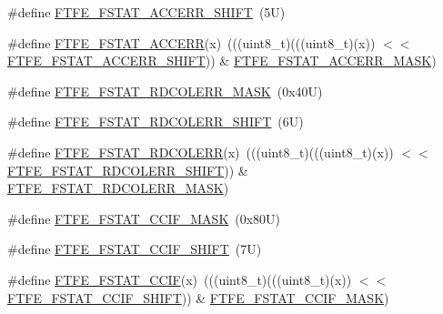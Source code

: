 \begin{DoxyCompactItemize}
\#define \mbox{\hyperlink{group___f_t_f_e___register___masks_ga6bb97df7d14c6a986778b1d8acb765b8}{F\+T\+F\+E\+\_\+\+F\+S\+T\+A\+T\+\_\+\+A\+C\+C\+E\+R\+R\+\_\+\+S\+H\+I\+FT}}~(5\+U)
\item 
\#define \mbox{\hyperlink{group___f_t_f_e___register___masks_gac7f2c643ef3e759daf6f37adab76dfdd}{F\+T\+F\+E\+\_\+\+F\+S\+T\+A\+T\+\_\+\+A\+C\+C\+E\+RR}}(x)~(((uint8\+\_\+t)(((uint8\+\_\+t)(x)) $<$$<$ \mbox{\hyperlink{group___f_t_f_e___register___masks_ga6bb97df7d14c6a986778b1d8acb765b8}{F\+T\+F\+E\+\_\+\+F\+S\+T\+A\+T\+\_\+\+A\+C\+C\+E\+R\+R\+\_\+\+S\+H\+I\+FT}})) \& \mbox{\hyperlink{group___f_t_f_e___register___masks_gac4af2fee557a255ba6f2d9aa5d32aaaa}{F\+T\+F\+E\+\_\+\+F\+S\+T\+A\+T\+\_\+\+A\+C\+C\+E\+R\+R\+\_\+\+M\+A\+SK}})
\item 
\#define \mbox{\hyperlink{group___f_t_f_e___register___masks_ga2b7a9107390c7761ae8c4d5a4f8941af}{F\+T\+F\+E\+\_\+\+F\+S\+T\+A\+T\+\_\+\+R\+D\+C\+O\+L\+E\+R\+R\+\_\+\+M\+A\+SK}}~(0x40\+U)
\item 
\#define \mbox{\hyperlink{group___f_t_f_e___register___masks_ga434a96f6b56c1c08f0f8c9e8c50ed9a8}{F\+T\+F\+E\+\_\+\+F\+S\+T\+A\+T\+\_\+\+R\+D\+C\+O\+L\+E\+R\+R\+\_\+\+S\+H\+I\+FT}}~(6\+U)
\item 
\#define \mbox{\hyperlink{group___f_t_f_e___register___masks_ga717e3f17e5c973d3388ac228ada53eaa}{F\+T\+F\+E\+\_\+\+F\+S\+T\+A\+T\+\_\+\+R\+D\+C\+O\+L\+E\+RR}}(x)~(((uint8\+\_\+t)(((uint8\+\_\+t)(x)) $<$$<$ \mbox{\hyperlink{group___f_t_f_e___register___masks_ga434a96f6b56c1c08f0f8c9e8c50ed9a8}{F\+T\+F\+E\+\_\+\+F\+S\+T\+A\+T\+\_\+\+R\+D\+C\+O\+L\+E\+R\+R\+\_\+\+S\+H\+I\+FT}})) \& \mbox{\hyperlink{group___f_t_f_e___register___masks_ga2b7a9107390c7761ae8c4d5a4f8941af}{F\+T\+F\+E\+\_\+\+F\+S\+T\+A\+T\+\_\+\+R\+D\+C\+O\+L\+E\+R\+R\+\_\+\+M\+A\+SK}})
\item 
\#define \mbox{\hyperlink{group___f_t_f_e___register___masks_gab1b2afd287fd5012f586840b391110a9}{F\+T\+F\+E\+\_\+\+F\+S\+T\+A\+T\+\_\+\+C\+C\+I\+F\+\_\+\+M\+A\+SK}}~(0x80\+U)
\item 
\#define \mbox{\hyperlink{group___f_t_f_e___register___masks_gac879e7876e19c43bd3d04bc1272e1be5}{F\+T\+F\+E\+\_\+\+F\+S\+T\+A\+T\+\_\+\+C\+C\+I\+F\+\_\+\+S\+H\+I\+FT}}~(7\+U)
\item 
\#define \mbox{\hyperlink{group___f_t_f_e___register___masks_ga85b63ed27428704ebcbc4f19b0e90c2a}{F\+T\+F\+E\+\_\+\+F\+S\+T\+A\+T\+\_\+\+C\+C\+IF}}(x)~(((uint8\+\_\+t)(((uint8\+\_\+t)(x)) $<$$<$ \mbox{\hyperlink{group___f_t_f_e___register___masks_gac879e7876e19c43bd3d04bc1272e1be5}{F\+T\+F\+E\+\_\+\+F\+S\+T\+A\+T\+\_\+\+C\+C\+I\+F\+\_\+\+S\+H\+I\+FT}})) \& \mbox{\hyperlink{group___f_t_f_e___register___masks_gab1b2afd287fd5012f586840b391110a9}{F\+T\+F\+E\+\_\+\+F\+S\+T\+A\+T\+\_\+\+C\+C\+I\+F\+\_\+\+M\+A\+SK}})
\end{DoxyCompactItemize}
